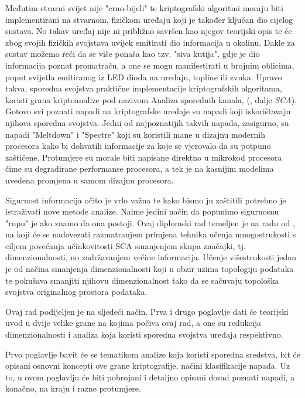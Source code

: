 \documentclass[times, utf8, diplomski]{fer}
\begin{document}
Međutim stvarni svijet nije "crno-bijeli" te kriptografski algoritmi moraju biti implementirani na stvarnom, fizičkom uređaju koji je također ključan dio cijelog sustava. No takav uređaj nije ni približno savršen kao njegov teorijski opis te će zbog svojih fizičkih svojstava uvijek emitirati dio informacija u okolinu. Dakle za sustav možemo reći da se više ponaša kao tzv. "siva kutija", gdje je dio informacija poznat promatraču, a one se mogu manifestirati u brojnim oblicima, poput svijetla emitiranog iz LED dioda na uređaju, topline ili zvuka. Upravo takva, sporedna svojstva praktične implementacije kriptografskih algoritama, koristi grana kriptoanalize pod nazivom Analiza sporednih kanala, (, dalje \emph{SCA}). Gotovo svi poznati napadi na kriptografske uređaje su napadi koji iskorištavaju njihova sporedna svojstva. Jedni od najpoznatijih takvih napada, zasigurno, su napadi "Meltdown" \citep{Lipp2018meltdown} i "Spectre" \citep{Kocher2018spectre} koji su koristili mane u dizajnu modernih procesora kako bi dohvatili informacije za koje se vjerovalo da su potpuno zaštićene. Protumjere su morale biti napisane direktno u mikrokod procesora čime su degradirane performanse procesora, a tek je na kasnijim modelima uvedena promjena u samom dizajnu procesora.

\medskip
Sigurnost informacija očito je vrlo važna te kako bismo ju zaštitili potrebno je istraživati nove metode analize. Naime jedini način da popunimo sigurnosnu "rupu" je ako znamo da ona postoji. Ovaj diplomski rad temeljen je na radu od \cite{8836108}, na koji će se nadovezati razmatranjem primjena tehnika učenja mnogostrukosti  s ciljem povećanja učinkovitosti SCA smanjenjem skupa značajki, tj. dimenzionalnosti, no zadržavanjem većine informacija. Učenje višestrukosti jedan je od načina smanjenja dimenzionalnosti koji u obzir uzima topologiju podataka te pokušava smanjiti njihovu dimenzionalnost tako da se sačuvaju topološka svojstva originalnog prostora podataka.

\bigskip
Ovaj rad podijeljen je na sljedeći način. Prva i drugo poglavlje dati će teorijski uvod u dvije velike grane na kojima počiva ovaj rad, a one su redukcija dimenzionalnosti i analiza koja koristi sporedna svojstva uređaja respektivno.

Prvo poglavlje bavit će se tematikom analize koja koristi sporedna sredstva, bit će opisani osnovni koncepti ove grane kriptografije, načini klasifikacije napada. Uz to, u ovom poglavlju će biti pobrojani i detaljno opisani dosad poznati napadi, a konačno, na kraju i razne protumjere.
\end{document}
